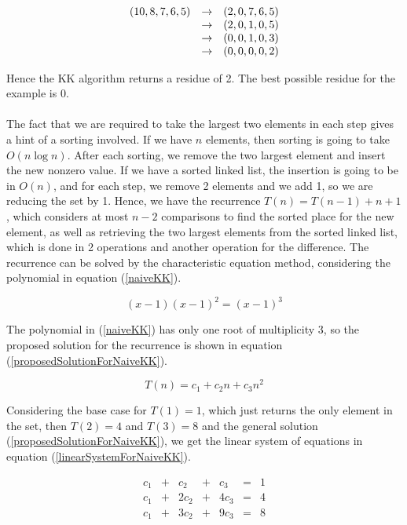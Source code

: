 \documentclass[tikz, 12pt]{scrartcl}
\begin{document}
\begin{equation}\label{exampleKK}
\centering
\begin{array}{ccc}
(10, 8, 7, 6, 5)	&	\rightarrow &	(2, 0, 7, 6, 5) \\
				&	\rightarrow	&	(2, 0, 1, 0, 5) \\
				&	\rightarrow &	(0, 0, 1, 0, 3) \\
				&	\rightarrow &	(0, 0, 0, 0, 2)
\end{array}
\end{equation}

Hence the KK algorithm returns a residue of 2. The best possible residue for the example is 0.\\
\\
The fact that we are required to take the largest two elements in each step gives a hint of a sorting involved. If we have $n$ elements, then sorting is going to take $O(n \log n)$. After each sorting, we remove the two largest element and insert the new nonzero value. If we have a sorted linked list, the insertion is going to be in $O(n)$, and for each step, we remove 2 elements and we add 1, so we are reducing the set by 1. Hence, we have the recurrence $T(n) = T(n - 1) + n + 1$ , which considers at most $n - 2$ comparisons to find the sorted place for the new element, as well as retrieving the two largest elements from the sorted linked list, which is done in 2 operations and another operation for the difference. The recurrence 
can be solved by the characteristic equation method, considering the polynomial in equation (\ref{naiveKK}).

\begin{equation}\label{naiveKK}
(x - 1)(x - 1)^2 = (x - 1)^3
\end{equation}

The polynomial in (\ref{naiveKK}) has only one root of multiplicity 3, so the proposed solution for the recurrence is shown in equation (\ref{proposedSolutionForNaiveKK}).

\begin{equation}\label{proposedSolutionForNaiveKK}
T(n)	=	c_1 + c_2 n + c_3 n^2
\end{equation}

Considering the base case for $T(1) = 1$, which just returns the only element in the set, then $T(2) = 4$ and $T(3) = 8$ and the general solution (\ref{proposedSolutionForNaiveKK}), we get the linear system of equations in equation (\ref{linearSystemForNaiveKK}).

\begin{equation}\label{linearSystemForNaiveKK}
\begin{array}{ccccccc}
c_1		&	+	&	c_2		&	+	&	c_3		&	=	&	1\\
c_1		&	+	&	2c_2	&	+	&	4c_3	&	=	&	4\\
c_1		&	+	&	3c_2	&	+	&	9c_3	&	=	&	8
\end{array}
\end{equation}
\end{document}
